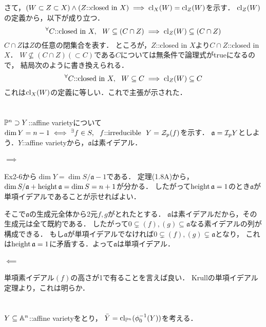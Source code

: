 \documentclass[a4paper]{jarticle}
\newcommand{\I}[1]{\mathfrak{#1}}
\begin{document}
    さて，$(W \subset Z \subset X) \land (Z\mbox{::closed in }X) \implies \operatorname{cl}_{X}(W)=\operatorname{cl}_{Z}(W)$を示す．
    $\operatorname{cl}_{Z}(W)$の定義から，以下が成り立つ．
    \[ {}^{\forall} C\mbox{::closed in }X,~~ W \subseteq (C \cap Z) \implies \operatorname{cl}_{Z}(W) \subseteq (C \cap Z) \]
    $C \cap Z$は$Z$の任意の閉集合を表す．
    ところが，$Z$::closed in $X$より$C \cap Z$::closed in $X$．
    $W \not \subseteq (C \cap Z)( \subset C)$である$C$については無条件で論理式がtrueになるので，
    結局次のように書き換えられる．
    \[ {}^{\forall} C\mbox{::closed in }X,~~ W \subseteq C \implies \operatorname{cl}_{Z}(W) \subseteq C \]
    これは$\operatorname{cl}_{X}(W)$の定義に等しい．これで主張が示された．

\section{} %
$\mathbb{P}^n \supset Y$::affine varietyについて$\dim Y=n-1 \iff {}^{\exists} f \in S,~~ f \mbox{::irreducible}~~ Y=\mathcal{Z}_p(f)$を示す．
    $\I{a}=\defsp{Y}$としよう．$Y$::affine varietyから，$\I{a}$は素イデアル．
    \paragraph{$\implies$}
    Ex2-6から$\dim Y=\dim S/\I{a}-1$である．
    定理(1.8A)から，$\dim S/\I{a}+\height \I{a}=\dim S=n+1$が分かる．
    したがって$\height \I{a}=1$のとき$\I{a}$が単項イデアルであることが示せればよい．

    そこで$\I{a}$の生成元全体から2元$f,g$がとれたとする．
    $\I{a}$は素イデアルだから，その生成元は全て既約である．
    したがって$0 \subsetneq (f),(g) \subseteq \I{a}$なる素イデアルの列が構成できる．
    もし$\I{a}$が単項イデアルでなければ$0 \subsetneq (f),(g) \subsetneq \I{a}$となり，
    これは$\height \I{a}=1$に矛盾する．よって$\I{a}$は単項イデアル．

    \paragraph{$\impliedby$}
    単項素イデアル$(f)$の高さが1で有ることを言えば良い．
    Krullの単項イデアル定理より，これは明らか．

\section{} %
    $Y \subseteq \mathbb{A}^n$::affine varietyをとり，
    $\bar{Y}=\operatorname{cl}_{\mathbb{P}^{n}}(\phi_0^{-1}(Y))$を考える．
\end{document}
